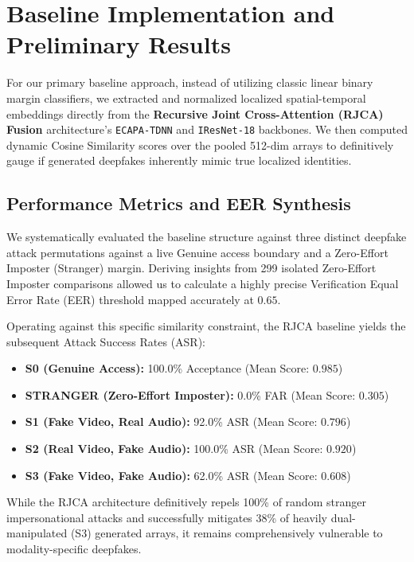 \documentclass[conference]{IEEEtran}
\begin{document}
\section{Baseline Implementation and Preliminary Results}

For our primary baseline approach, instead of utilizing classic linear binary margin classifiers, we extracted and normalized localized spatial-temporal embeddings directly from the \textbf{Recursive Joint Cross-Attention (RJCA) Fusion} architecture's \texttt{ECAPA-TDNN} and \texttt{IResNet-18} backbones. We then computed dynamic Cosine Similarity scores over the pooled 512-dim arrays to definitively gauge if generated deepfakes inherently mimic true localized identities.

\subsection{Performance Metrics and EER Synthesis}
We systematically evaluated the baseline structure against three distinct deepfake attack permutations against a live Genuine access boundary and a Zero-Effort Imposter (Stranger) margin. Deriving insights from 299 isolated Zero-Effort Imposter comparisons allowed us to calculate a highly precise Verification Equal Error Rate (EER) threshold mapped accurately at $\mathbf{0.65}$.

Operating against this specific similarity constraint, the RJCA baseline yields the subsequent Attack Success Rates (ASR):

\begin{itemize}
    \item \textbf{S0 (Genuine Access):} 100.0\% Acceptance (Mean Score: $0.985$)
    \item \textbf{STRANGER (Zero-Effort Imposter):} 0.0\% FAR (Mean Score: $0.305$)
    \item \textbf{S1 (Fake Video, Real Audio):} 92.0\% ASR (Mean Score: $0.796$)
    \item \textbf{S2 (Real Video, Fake Audio):} 100.0\% ASR (Mean Score: $0.920$)
    \item \textbf{S3 (Fake Video, Fake Audio):} 62.0\% ASR (Mean Score: $0.608$)
\end{itemize}

While the RJCA architecture definitively repels 100\% of random stranger impersonational attacks and successfully mitigates 38\% of heavily dual-manipulated (S3) generated arrays, it remains comprehensively vulnerable to modality-specific deepfakes.
\end{document}

